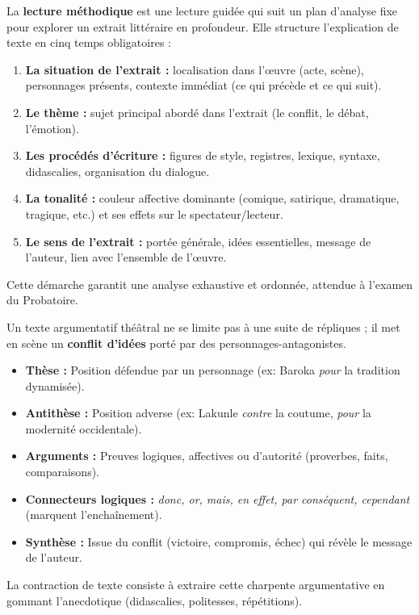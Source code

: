 \documentclass[11pt]{article}
\newcommand{\cle}[1]{{\popxbold\color{popdark}#1}}
\begin{document}
\begin{definition}
La \textbf{lecture méthodique} est une lecture guidée qui suit un plan d'analyse fixe pour explorer un extrait littéraire en profondeur. Elle structure l'explication de texte en cinq temps obligatoires :
\begin{enumerate}
    \item \textbf{La situation de l'extrait :} localisation dans l'œuvre (acte, scène), personnages présents, contexte immédiat (ce qui précède et ce qui suit).
    \item \textbf{Le thème :} sujet principal abordé dans l'extrait (le conflit, le débat, l'émotion).
    \item \textbf{Les procédés d'écriture :} figures de style, registres, lexique, syntaxe, didascalies, organisation du dialogue.
    \item \textbf{La tonalité :} couleur affective dominante (comique, satirique, dramatique, tragique, etc.) et ses effets sur le spectateur/lecteur.
    \item \textbf{Le sens de l'extrait :} portée générale, idées essentielles, message de l'auteur, lien avec l'ensemble de l'œuvre.
\end{enumerate}
Cette démarche garantit une analyse exhaustive et ordonnée, attendue à l'examen du Probatoire.
\end{definition}

\begin{aretenir}
Un texte argumentatif théâtral ne se limite pas à une suite de répliques ; il met en scène un \textbf{conflit d'idées} porté par des personnages-antagonistes.
\begin{itemize}
    \item \textbf{Thèse :} Position défendue par un personnage (ex: Baroka \emph{pour} la tradition dynamisée).
    \item \textbf{Antithèse :} Position adverse (ex: Lakunle \emph{contre} la coutume, \emph{pour} la modernité occidentale).
    \item \textbf{Arguments :} Preuves logiques, affectives ou d'autorité (proverbes, faits, comparaisons).
    \item \textbf{Connecteurs logiques :} \emph{donc, or, mais, en effet, par conséquent, cependant} (marquent l'enchaînement).
    \item \textbf{Synthèse :} Issue du conflit (victoire, compromis, échec) qui révèle le message de l'auteur.
\end{itemize}
La \cle{contraction de texte} consiste à extraire cette charpente argumentative en gommant l'anecdotique (didascalies, politesses, répétitions).
\end{aretenir}
\end{document}
